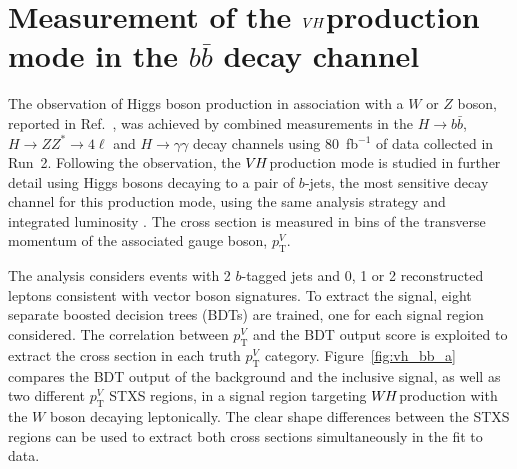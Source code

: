 \documentclass{moriond}
\def\wh{\texorpdfstring{\ensuremath{W\kern -0.1em H}\xspace}{WH\xspace}}
\def\vh{\texorpdfstring{\ensuremath{V\kern -0.1em H}\xspace}{VH\xspace}}
\begin{document}
\section{Measurement of the \vh production mode in the $b\bar b$ decay channel}\label{sec:vh_bb}

The observation of Higgs boson production in association with a $W$ or $Z$ boson, reported in
Ref.~\cite{HIGG-2018-04}, was achieved by combined measurements in the $H{\rightarrow}b\bar b$,
$H{\rightarrow}ZZ^*{\rightarrow}4\ell$ and $H{\rightarrow}\gamma\gamma$ decay channels using
80~fb$^{-1}$ of data collected in Run~2.
Following the observation, the \vh production mode is studied in further detail using Higgs bosons
decaying to a pair of $b$-jets, the most sensitive decay channel for this production mode,
using the same analysis strategy and integrated luminosity \cite{Aaboud:2019nan}.
The cross section is measured in bins of the transverse momentum of the associated gauge boson,
$p^{V}_\mathrm{T}$.

The analysis considers events with 2 $b$-tagged jets and 0, 1 or 2 reconstructed leptons consistent
with vector boson signatures. To extract the signal, eight separate boosted decision trees (BDTs)
are trained, one for each signal region considered.
The correlation between $p^{V}_\mathrm{T}$ and the BDT output score is exploited
to extract the cross section in each truth $p^{V}_\mathrm{T}$ category.
Figure~\ref{fig:vh_bb_a} compares the BDT output of the background and the inclusive signal,
as well as two different $p^{V}_\mathrm{T}$
STXS regions, in a signal region targeting \wh production with the $W$ boson decaying leptonically.
The clear shape differences between the STXS regions can be used to
extract both cross sections simultaneously in the fit to data.
\end{document}

